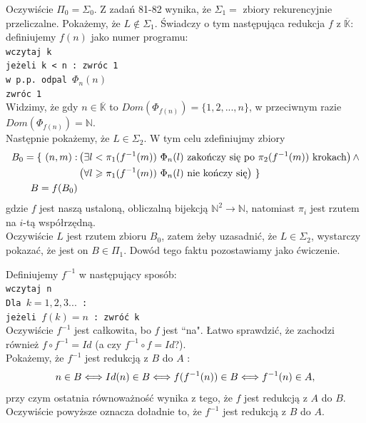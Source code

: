 \documentclass[a4paper,11pt]{article}
\newenvironment{zadanie}[1]
  {\renewcommand\theinnercustomthm{#1}\innercustomthm}
  {\endinnercustomthm}
\begin{document}
\begin{zadanie}{100}
\end{zadanie}
Oczywiście $\Pi_0 = \Sigma_0$. Z zadań 81-82 wynika, że $\Sigma_1 = $ zbiory rekurencyjnie przeliczalne. Pokażemy, że
$ L \notin \Sigma_1$. Świadczy o tym następująca redukcja $f$ z $\overline{\mathbb{K}}$: definiujemy $f(n)$ jako numer
programu: \\
\texttt{wczytaj k \\ jeżeli k < n : zwróc 1 \\ w p.p. odpal $\Phi_n(n)$ \\ zwróc 1 \\}
Widzimy, że gdy $n \in \overline{\mathbb{K}}$ to  $Dom(\Phi_{f(n)}) = \{1,2,...,n\}$, w przeciwnym razie 
$Dom(\Phi_{f(n)}) = \mathbb{N}$. \\
Następnie pokażemy, że $L \in \Sigma_2$. W tym celu zdefiniujmy zbiory
\begin{align}
 B_0 = \{ \ (n,m) : &\left( \exists l<\pi_1(f^{-1}(m)) \ \Phi_n(l) \text{ zakończy się po $ \pi_2(f^{-1}(m)) $ krokach} \right) \wedge \notag \\ 
 &\left( \forall l \geqslant \pi_1(f^{-1}(m)) \ \Phi_n(l) \text{ nie kończy się} \right) \ \} \notag \\
 B = f(B_0) \notag
\end{align}
gdzie $f$ jest naszą ustaloną, obliczalną bijekcją $\mathbb{N}^2 \longrightarrow \mathbb{N}$, natomiast $\pi_i$ jest rzutem
na $i$-tą współrzędną. \\
Oczywiście $L$ jest rzutem zbioru $B_0$, zatem żeby uzasadnić, że $L \in \Sigma_2$, wystarczy pokazać, 
że jest on $B \in \Pi_1$. Dowód tego faktu pozostawiamy jako ćwiczenie.


\begin{zadanie}{101}
\end{zadanie}
Definiujemy $f^{-1}$ w następujący sposób: \\
\texttt{wczytaj n \\ Dla $k=1,2,3...$ : \\ jeżeli $f(k) = n$ : zwróć k \\ }
Oczywiście $f^{-1}$ jest całkowita, bo $f$ jest ``na". Łatwo sprawdzić, że zachodzi również $f \circ f^{-1} = Id$ 
(a czy $f^{-1} \circ f = Id$?). \\
Pokażemy, że $f^{-1}$ jest redukcją z $B$ do $A$ :
\begin{align}
 n \in B \Longleftrightarrow Id(n) \in B \Longleftrightarrow f(f^{-1}(n)) \in B \Longleftrightarrow f^{-1}(n) \in A, \notag 
\end{align}
przy czym ostatnia równoważność wynika z tego, że $f$ jest redukcją z $A$ do $B$. Oczywiście powyższe oznacza doładnie to,
że $f^{-1}$ jest redukcją z $B$ do $A$.
\end{document}
